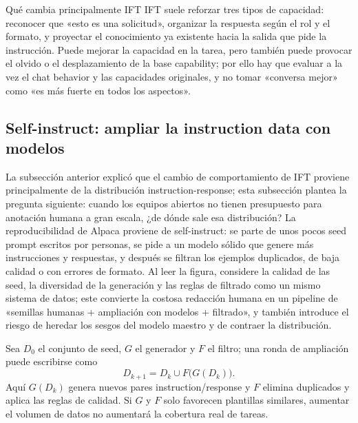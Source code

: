 \begin{importantbox}{Qué cambia principalmente IFT}
IFT suele reforzar tres tipos de capacidad: reconocer que «esto es una solicitud», organizar la respuesta según el rol y el formato, y proyectar el conocimiento ya existente hacia la salida que pide la instrucción. Puede mejorar la capacidad en la tarea, pero también puede provocar el olvido o el desplazamiento de la base capability; por ello hay que evaluar a la vez el chat behavior y las capacidades originales, y no tomar «conversa mejor» como «es más fuerte en todos los aspectos».
\end{importantbox}


\subsection{Self-instruct: ampliar la instruction data con modelos}

La subsección anterior explicó que el cambio de comportamiento de IFT proviene principalmente de la distribución instruction-response; esta subsección plantea la pregunta siguiente: cuando los equipos abiertos no tienen presupuesto para anotación humana a gran escala, ¿de dónde sale esa distribución? La reproducibilidad de Alpaca proviene de self-instruct: se parte de unos pocos seed prompt escritos por personas, se pide a un modelo sólido que genere más instrucciones y respuestas, y después se filtran los ejemplos duplicados, de baja calidad o con errores de formato. Al leer la figura, considere la calidad de las seed, la diversidad de la generación y las reglas de filtrado como un mismo sistema de datos; este convierte la costosa redacción humana en un pipeline de «semillas humanas + ampliación con modelos + filtrado», y también introduce el riesgo de heredar los sesgos del modelo maestro y de contraer la distribución.


Sea $D_0$ el conjunto de seed, $G$ el generador y $F$ el filtro; una ronda de ampliación puede escribirse como
\[
D_{k+1}=D_k\cup F\bigl(G(D_k)\bigr).
\]
Aquí $G(D_k)$ genera nuevos pares instruction/response y $F$ elimina duplicados y aplica las reglas de calidad. Si $G$ y $F$ solo favorecen plantillas similares, aumentar el volumen de datos no aumentará la cobertura real de tareas.

